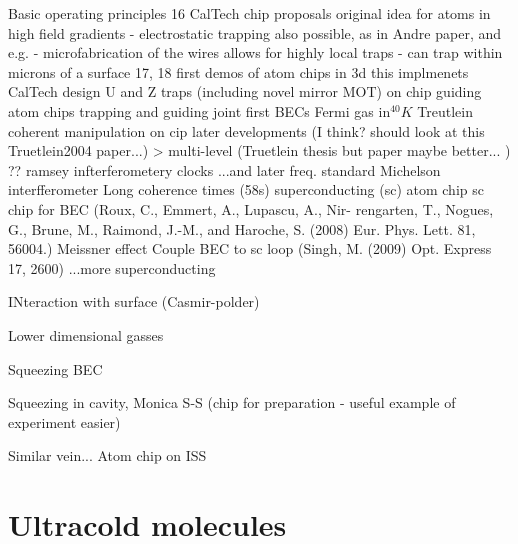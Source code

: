 Basic operating principles
16 CalTech chip proposals original idea for atoms in high field gradients \cite{PhysRevA.52.4004}
- electrostatic trapping also possible, as in Andre paper, and e.g.  \cite{Bethlem2000}
- microfabrication of the wires allows for highly local traps
- can trap within microns of a surface
17, 18 first demos of atom chips in 3d \cite{PhysRevLett.80.1634} \cite{PhysRevLett.81.5310}
this \cite{Drindic1998} implmenets CalTech design%
U and Z traps \cite{Reichel1999} (including novel mirror MOT)
on chip guiding \cite{PhysRevLett.82.2014}
atom chips trapping and guiding \cite{Folman2000}
joint first BECs \cite{Hansel2001} \cite{Ott2001}
Fermi gas in$^{40}K$ \cite{Aubin2006}
Treutlein coherent manipulation on cip \cite{Treutlein2004}
later developments (I think? should look at this Truetlein2004 paper...)
  > multi-level (Truetlein thesis \cite{Treutlein2008} but paper maybe better... \cite{Boehi2009})
?? ramsey infterferometery
clocks \cite{Knappe2004}
...and later freq. standard \cite{RAMIREZMARTINEZ2011247}
Michelson interfferometer \cite{Wang2005}
Long coherence times (58s) \cite{Deutsch2010}
superconducting (sc) atom chip \cite{Nirrengarten2006}
sc chip for BEC
(Roux, C., Emmert, A., Lupascu, A., Nir- rengarten, T., Nogues, G., Brune, M.,
Raimond, J.-M., and Haroche, S. (2008) Eur. Phys. Lett. 81, 56004.)
Meissner effect \cite{Cano2008}
Couple BEC to sc loop (Singh, M. (2009) Opt. Express 17, 2600)
...more superconducting \cite{Bernon2013}

INteraction with surface (Casmir-polder)
\cite{PhysRevA.72.033610}
\cite{PhysRevLett.98.063201}


Lower dimensional gasses
\cite{PhysRevLett.116.030402}
\cite{Hofferberth2007}
\cite{Yuen2015}

Squeezing BEC
\cite{PhysRevLett.105.080403}

Squeezing in cavity, Monica S-S (chip for preparation - useful example of experiment
easier) \cite{PhysRevLett.104.073604}

Similar vein...  Atom chip on ISS \cite{Frye2021}

\section{Ultracold molecules}


